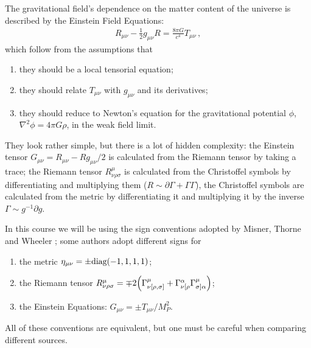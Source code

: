 \documentclass[main.tex]{subfiles}
\begin{document}
The gravitational field's dependence on the matter content of the universe is described by the Einstein Field Equations: 
%
\begin{align}
R_{\mu \nu } - \frac{1}{2} g_{\mu \nu } R = \frac{8 \pi G}{c^{4}} T_{\mu \nu } 
\,,
\end{align}
%
which follow from the assumptions that 
\begin{enumerate}
  \item they should be a local tensorial equation;
  \item they should relate \(T_{\mu \nu } \) with \(g_{\mu \nu }\) and its derivatives;
  \item they should reduce to Newton's equation for the gravitational potential \(\phi \), \(\nabla^2 \phi = 4 \pi G \rho \), in the weak field limit.
\end{enumerate}

They look rather simple, but there is a lot of hidden complexity: the Einstein tensor \(G_{\mu \nu } = R_{\mu \nu } - R g_{\mu \nu } / 2\) is  calculated from the Riemann tensor by taking a trace; the Riemann tensor \(R^{\mu }_{\nu \rho \sigma } \) is calculated from the Christoffel symbols by differentiating and multiplying them (\(R \sim \partial \Gamma  + \Gamma \Gamma \)), the Christoffel symbols are calculated from the metric by differentiating it and multiplying it by the inverse \(\Gamma \sim g^{-1} \partial g\).  

In this course we will be using the sign conventions adopted by Misner, Thorne and Wheeler \cite[page 3]{misnerGravitation1973}; some authors adopt different signs for 
\begin{enumerate}
  \item the metric \(\eta_{\mu \nu } = \pm \text{diag}\qty(-1, 1, 1, 1)\);
  \item the Riemann tensor \(R^{\mu }_{\nu \rho \sigma } = \mp 2 \qty(\Gamma^{\mu }_{\nu [\rho , \sigma] } + \Gamma^{\alpha }_{\nu [\rho }\Gamma^{\mu }_{\sigma ] \alpha })\);
  \item the Einstein Equations: \(G_{\mu \nu } = \pm T_{\mu \nu } / M_P^2\).
\end{enumerate} 

All of these conventions are equivalent, but one must be careful when comparing different sources.
\end{document}
